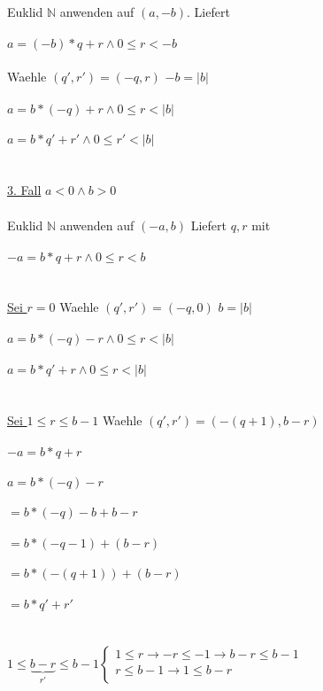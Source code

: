 \documentclass[18pt,a4paper]{article}
\newcommand{\tab}{\hspace*{2em}}
\begin{document}
\\
Euklid $\mathbb{N}$ anwenden auf $(a, -b)$. Liefert\\
\\
$a = (-b)*q + r \wedge 0 \leqslant r < -b$\\
\\
Waehle $(q', r') = (-q, r)$ \tab $-b = |b|$\\
\\
$a = b*(-q) + r \wedge 0 \leqslant r < |b|$\\
\\
$a = b*q' + r' \wedge 0 \leqslant r' < |b|$\\
\\
\\
\uline{3. Fall} $a< 0 \wedge b > 0 $\\
\\
Euklid $\mathbb{N}$ anwenden auf $(-a,b)$ Liefert $q, r$ mit\\
\\
$-a = b*q + r \wedge 0 \leqslant r < b$\\
\\
\\
\uline{Sei $r=0$} Waehle $(q', r') = (-q, 0)$ \tab  $b = |b|$\\
\\
$a = b*(-q) - r \wedge 0 \leqslant r < |b|$\\
\\
$a = b*q' + r \wedge 0 \leqslant r < |b|$\\
\\
\\
\uline{Sei $1\leqslant r \leqslant b-1$} Waehle $(q', r') = (-(q+1), b-r)$\\
\\
$-a = b*q + r$\\
\\
$a = b*(-q) -r$\\
\\
$= b*(-q) -b+b -r$\\
\\
$= b*(-q-1) +(b-r)$\\
\\
$= b*(-(q+1)) +(b-r)$\\
\\
$= b*q' + r'$\\
\\
\\
$1\leqslant \underbrace{b-r}_\text{$r'$} \leqslant b-1 \begin{cases} 
                               1\leqslant r \rightarrow -r\leqslant -1 \rightarrow b-r \leqslant b-1\\
				r \leqslant b-1 \rightarrow 1 \leqslant b-r\\
                              \end{cases}$\\
\end{document}
